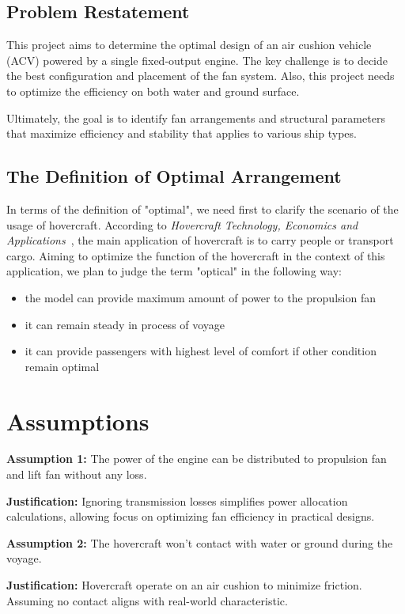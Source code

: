 \subsection{Problem Restatement}
This project aims to determine the optimal design of an air cushion vehicle (ACV) powered by a single fixed-output engine. The key challenge is to decide the best configuration and placement of the fan system. Also, this project needs to optimize the efficiency on both water and ground surface.

Ultimately, the goal is to identify fan arrangements and structural parameters that maximize efficiency and stability that applies to various ship types.

\subsection{The Definition of Optimal Arrangement}

In terms of the definition of "optimal", we need first to clarify the scenario of the usage of hovercraft. According to \textit{Hovercraft Technology, Economics and Applications}~\cite{amyot2013hovercraft}, the main application of hovercraft is to carry people or transport cargo. Aiming to optimize the function of the hovercraft in the context of this application, we plan to judge the term "optical" in the following way: 
\begin{itemize}
\item the model can provide maximum amount of power to the propulsion fan
\item it can remain steady in process of voyage 
\item it can provide passengers with highest level of comfort if other condition remain optimal
\end{itemize}
\section{Assumptions}

\textbf{Assumption 1:} The power of the engine can be distributed to propulsion fan and lift fan without any loss.

\textbf{Justification:} Ignoring transmission losses simplifies power allocation calculations, allowing focus on optimizing fan efficiency in practical designs.

\textbf{Assumption 2:} The hovercraft won't contact with water or ground during the voyage.

\textbf{Justification:} Hovercraft operate on an air cushion to minimize friction. Assuming no contact aligns with real-world characteristic.

